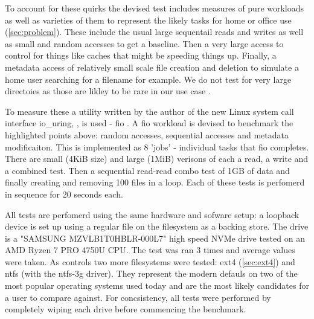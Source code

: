         To account for these quirks the devised test includes measures of pure
        workloads as well as varieties of them to represent the likely tasks
        for home or office use (\autoref{sec:problem}). These include the usual
        large sequentail reads and writes as well as small and random accesses
        to get a baseline. Then a very large access to control for things like
        caches that might be speeding things up. Finally, a metadata access of
        relatively small scale file creation and deletion to simulate a home
        user searching for a filename for example. We do not test for very
        large directoies as those are likley to be rare in our use case
        \cite{contents_study}.


        To measure these a utility written by the author of the new Linux
        system call interface io\_uring, , is used - fio
        \cite{fio}. A fio workload is devised to benchmark the highlighted
        points above: random accesses, sequential accesses and metadata
        modificaiton. This is implemented as 8 'jobs' - individual tasks that
        fio completes. There are small (4KiB size) and large (1MiB) verisons
        of each a read, a write and a combined test. Then a sequential
        read-read combo test of 1GB of data and finally creating and removing
        100 files in a loop. Each of these tests is perfomerd in sequence for
        20 seconds each.

        All tests are perfomerd using the same hardware and sofware setup: a
        loopback device is set up using a regular file on the filesystem as a
        backing store. The drive is a "SAMSUNG MZVLB1T0HBLR-000L7" high speed
        NVMe drive tested on an AMD Ryzen 7 PRO 4750U CPU. The test was ran 3
        times and average values were taken. As controls two more filesystems
        were tested: ext4 (\autoref{sec:ext4}) and ntfs (with the ntfs-3g driver).
        They represent the modern defauls on two of the most popular operating
        systems used today and are the most likely candidates for a user to
        compare against. For concsistency, all tests were performed by
        completely wiping each drive before commencing the benchmark.


